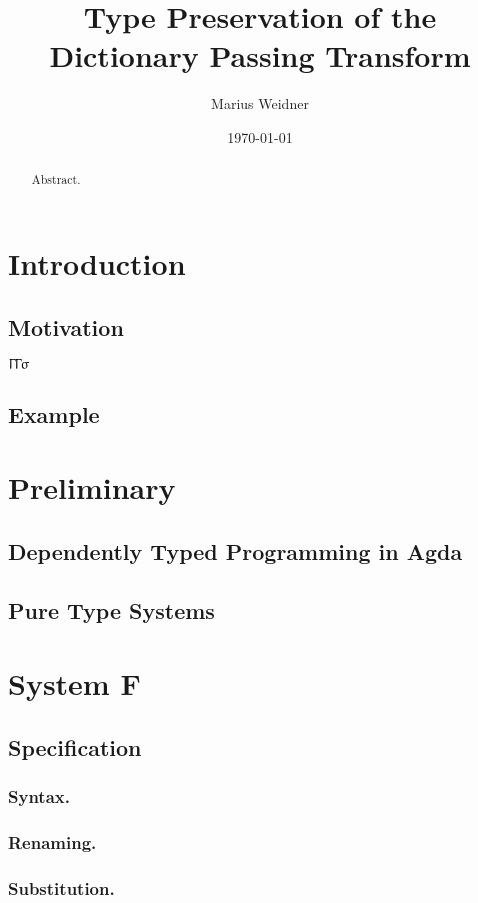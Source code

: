 \documentclass[runningheads]{llncs}
\newcommand{\cx}{\Upgamma}
\newcommand{\poly}{\upsigma}
\begin{document}
\title{Type Preservation of the Dictionary Passing Transform}
\author{Marius Weidner}
\date\today
\maketitle
\begin{abstract}
  Abstract.
\end{abstract}

\section{Introduction}
\subsection{Motivation}
$\cx\cx\poly$
\subsection{Example}
\section{Preliminary}
\subsection{Dependently Typed Programming in Agda}
\subsection{Pure Type Systems}
\section{System F}
\subsection{Specification}
\subsubsection{Syntax.} 
\subsubsection{Renaming.}
\subsubsection{Substitution.}
\end{document}
